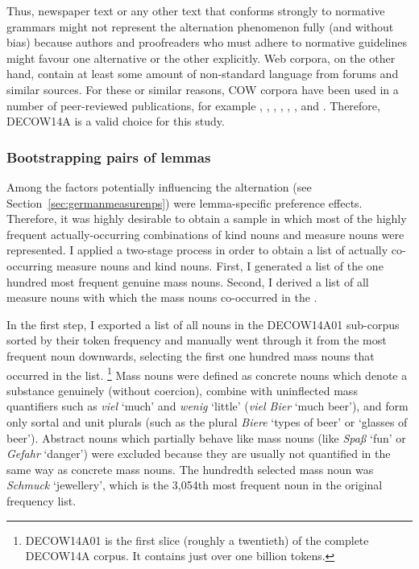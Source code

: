 Thus, newspaper text or any other text that conforms strongly to normative grammars might not represent the alternation phenomenon fully (and without bias) because authors and proofreaders who must adhere to normative guidelines might favour one alternative or the other explicitly.
Web corpora, on the other hand, contain at least some amount of non-standard language from forums and similar sources.
For these or similar reasons, COW corpora have been used in a number of peer-reviewed publications, for example \cite{VanGoethemHiligsmann2014}, \cite{VanGoethemHuening2015}, \cite{MuellerS2014}, \cite{Schaefer2016c}, \cite{SchaeferSayatz2014}, \cite{SchaeferSayatz2016}, and \cite{Zimmer2015}. 
Therefore, DECOW14A is a valid choice for this study.


\subsubsection{Bootstrapping pairs of lemmas}
\label{sec:bootstrappinlemmapairs}

Among the factors potentially influencing the alternation (see Section~\ref{sec:germanmeasurenps}) were lemma-specific preference effects.
Therefore, it was highly desirable to obtain a sample in which most of the highly frequent actually-occurring combinations of kind nouns and measure nouns were represented.
I applied a two-stage process in order to obtain a list of actually co-occurring measure nouns and kind nouns.
First, I generated a list of the one hundred most frequent genuine mass nouns.
Second, I derived a list of all measure nouns with which the mass nouns co-occurred in the \NACb.

In the first step, I exported a list of all nouns in the DECOW14A01 sub-corpus sorted by their token frequency and manually went through it from the most frequent noun downwards, selecting the first one hundred mass nouns that occurred in the list.%
\footnote{DECOW14A01 is the first slice (roughly a twentieth) of the complete DECOW14A corpus.
It contains just over one billion tokens.}
Mass nouns were defined as concrete nouns which denote a substance genuinely (without coercion), combine with uninflected mass quantifiers such as \textit{viel} `much' and \textit{wenig} `little' (\textit{viel Bier} `much beer'), and form only sortal and unit plurals (such as the plural \textit{Biere} `types of beer' or `glasses of beer').
Abstract nouns which partially behave like mass nouns (like \textit{Spaß} `fun’ or \textit{Gefahr} `danger’) were excluded because they are usually not quantified in the same way as concrete mass nouns.
The hundredth selected mass noun was \textit{Schmuck} `jewellery’, which is the 3,054th most frequent noun in the original frequency list.

